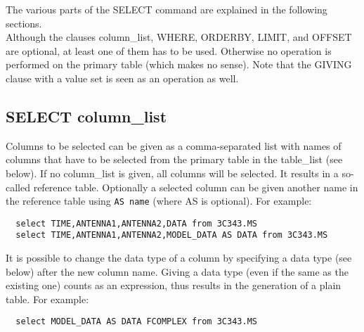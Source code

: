The various parts of the SELECT command are explained in the following
sections.
\\Although the clauses column\_list, WHERE, ORDERBY, LIMIT, and OFFSET
are optional,
at least one of them has to be used. Otherwise no operation is
performed on the primary table (which makes no sense).
Note that the GIVING clause with a value set is seen as an operation
as well.

\subsection{\label{TAQL:COLUMNLIST}SELECT column\_list}
Columns to be selected can be given as
a comma-separated list with names of columns that have to be
selected from the primary table in the table\_list (see below).
If no column\_list is given, all columns will be selected.
It results in a so-called reference table. Optionally a
selected column can be given another name in the reference
table using \texttt{AS name} (where AS is optional).
For example:
\begin{verbatim}
  select TIME,ANTENNA1,ANTENNA2,DATA from 3C343.MS
  select TIME,ANTENNA1,ANTENNA2,MODEL_DATA AS DATA from 3C343.MS
\end{verbatim}
It is possible to change the data type of a column by specifying a
data type (see below) after the new column name. Giving a data type
(even if the same as the existing one) counts as an expression,
thus results in the generation of a plain table.
For example:
\begin{verbatim}
  select MODEL_DATA AS DATA FCOMPLEX from 3C343.MS
\end{verbatim}

